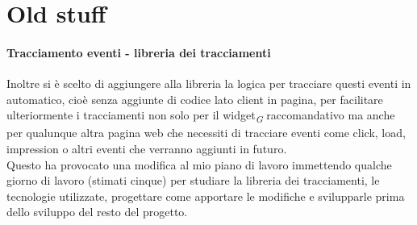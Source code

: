 \documentclass[a4paper, 12pt, twoside, openright]{book}
\newcommand{\gloss}[1]{#1\textsubscript{\textit{\tiny{G}}}}
\begin{document}




\chapter{Old stuff}
\subsubsection{Tracciamento eventi - libreria dei tracciamenti}
Inoltre si è scelto di aggiungere alla libreria la logica per tracciare questi eventi in automatico, cioè senza aggiunte di codice lato client in pagina, per facilitare ulteriormente i tracciamenti non solo per il \gloss{widget} raccomandativo ma anche per qualunque altra pagina web che necessiti di tracciare eventi come click, load, impression o altri eventi che verranno aggiunti in futuro.\\
Questo ha provocato una modifica al mio piano di lavoro immettendo qualche giorno di lavoro (stimati cinque) per studiare la libreria dei tracciamenti, le tecnologie utilizzate, progettare come apportare le modifiche e svilupparle prima dello sviluppo del resto del progetto.\\
\end{document}
